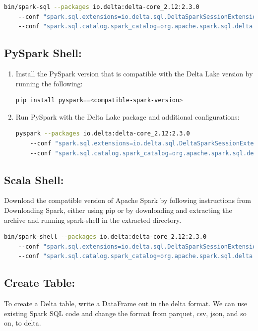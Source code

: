 \begin{lstlisting}[language=bash]
    bin/spark-sql --packages io.delta:delta-core_2.12:2.3.0
    --conf "spark.sql.extensions=io.delta.sql.DeltaSparkSessionExtension"
    --conf "spark.sql.catalog.spark_catalog=org.apache.spark.sql.delta.catalog.DeltaCatalog"
\end{lstlisting}

\subsection*{PySpark Shell:}
\begin{enumerate}
    \item Install the PySpark version that is compatible with the Delta Lake version by running the following:
    \begin{lstlisting}[language=bash]
    pip install pyspark==<compatible-spark-version>
    \end{lstlisting}
    \item Run PySpark with the Delta Lake package and additional configurations:
    \begin{lstlisting}[language=bash]
    pyspark --packages io.delta:delta-core_2.12:2.3.0 
    --conf "spark.sql.extensions=io.delta.sql.DeltaSparkSessionExtension" 
    --conf "spark.sql.catalog.spark_catalog=org.apache.spark.sql.delta.catalog.DeltaCatalog"
    \end{lstlisting}
\end{enumerate}

\subsection*{Scala Shell:}
Download the compatible version of Apache Spark by following instructions from Downloading Spark, either using pip or by downloading and extracting the archive and running spark-shell in the extracted directory.

\begin{lstlisting}[language=bash]
    bin/spark-shell --packages io.delta:delta-core_2.12:2.3.0 
    --conf "spark.sql.extensions=io.delta.sql.DeltaSparkSessionExtension" 
    --conf "spark.sql.catalog.spark_catalog=org.apache.spark.sql.delta.catalog.DeltaCatalog"
\end{lstlisting}

\subsection*{Create Table:}
To create a Delta table, write a DataFrame out in the delta format. We can use existing Spark SQL code and change the format from parquet, csv, json, and so on, to delta.

